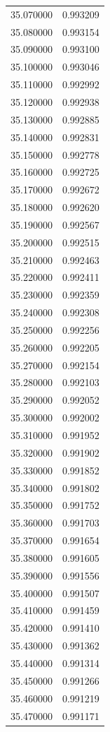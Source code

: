 \begin{tabular}{rr}
35.070000 & 0.993209 \\
35.080000 & 0.993154 \\
35.090000 & 0.993100 \\
35.100000 & 0.993046 \\
35.110000 & 0.992992 \\
35.120000 & 0.992938 \\
35.130000 & 0.992885 \\
35.140000 & 0.992831 \\
35.150000 & 0.992778 \\
35.160000 & 0.992725 \\
35.170000 & 0.992672 \\
35.180000 & 0.992620 \\
35.190000 & 0.992567 \\
35.200000 & 0.992515 \\
35.210000 & 0.992463 \\
35.220000 & 0.992411 \\
35.230000 & 0.992359 \\
35.240000 & 0.992308 \\
35.250000 & 0.992256 \\
35.260000 & 0.992205 \\
35.270000 & 0.992154 \\
35.280000 & 0.992103 \\
35.290000 & 0.992052 \\
35.300000 & 0.992002 \\
35.310000 & 0.991952 \\
35.320000 & 0.991902 \\
35.330000 & 0.991852 \\
35.340000 & 0.991802 \\
35.350000 & 0.991752 \\
35.360000 & 0.991703 \\
35.370000 & 0.991654 \\
35.380000 & 0.991605 \\
35.390000 & 0.991556 \\
35.400000 & 0.991507 \\
35.410000 & 0.991459 \\
35.420000 & 0.991410 \\
35.430000 & 0.991362 \\
35.440000 & 0.991314 \\
35.450000 & 0.991266 \\
35.460000 & 0.991219 \\
35.470000 & 0.991171 \\

\end{tabular}
